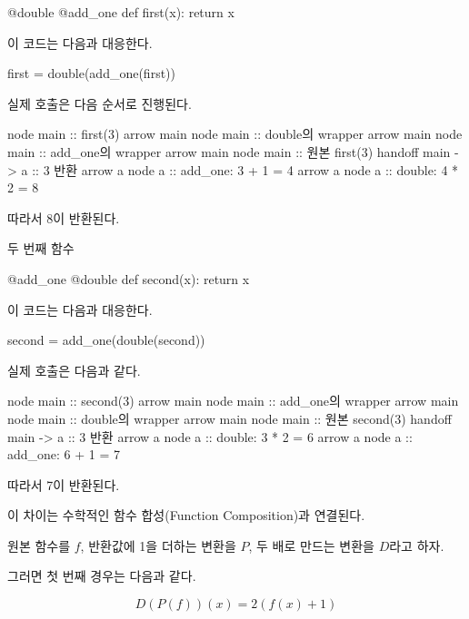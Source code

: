 \begin{dhkcode}
@double
@add_one
def first(x):
    return x
\end{dhkcode}

이 코드는 다음과 대응한다.

\begin{dhkcode}
first = double(add_one(first))
\end{dhkcode}

실제 호출은 다음 순서로 진행된다.

\begin{dhkbranch}[in=8]
node main :: first(3)
arrow main
node main :: double의 wrapper
arrow main
node main :: add_one의 wrapper
arrow main
node main :: 원본 first(3)
handoff main -> a :: 3 반환
arrow a
node a :: add_one: 3 + 1 = 4
arrow a
node a :: double: 4 * 2 = 8
\end{dhkbranch}

따라서 8이 반환된다.

\begin{dhknote}
\begin{dhksmry}[centered]
두 번째 함수
\end{dhksmry}
\end{dhknote}

\begin{dhkcode}
@add_one
@double
def second(x):
    return x
\end{dhkcode}

이 코드는 다음과 대응한다.

\begin{dhkcode}
second = add_one(double(second))
\end{dhkcode}

실제 호출은 다음과 같다.

\begin{dhkbranch}[in=8]
node main :: second(3)
arrow main
node main :: add_one의 wrapper
arrow main
node main :: double의 wrapper 
arrow main
node main :: 원본 second(3)
handoff main -> a :: 3 반환
arrow a
node a :: double: 3 * 2 = 6
arrow a
node a :: add_one: 6 + 1 = 7
\end{dhkbranch}

따라서 7이 반환된다.

이 차이는 수학적인 함수 합성(Function Composition)과 연결된다.

원본 함수를 \(f\), 반환값에 1을 더하는 변환을 \(P\), 두 배로 만드는 변환을 \(D\)라고 하자.

그러면 첫 번째 경우는 다음과 같다.

\[
D(P(f))(x)=2(f(x)+1)
\]

